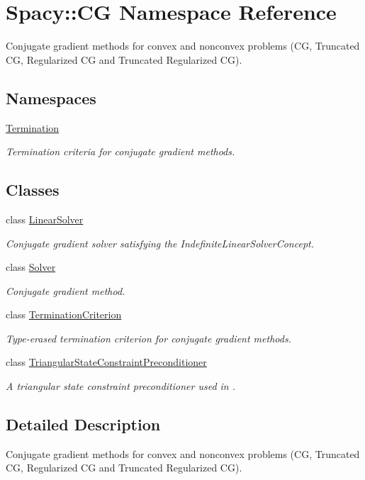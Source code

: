 \hypertarget{namespaceSpacy_1_1CG}{}\section{Spacy\+:\+:CG Namespace Reference}
\label{namespaceSpacy_1_1CG}


Conjugate gradient methods for convex and nonconvex problems (CG, Truncated CG, Regularized CG and Truncated Regularized CG).  


\subsection*{Namespaces}
\begin{DoxyCompactItemize}
\item 
 \hyperlink{namespaceSpacy_1_1CG_1_1Termination}{Termination}
\begin{DoxyCompactList}\small\item\em Termination criteria for conjugate gradient methods. \end{DoxyCompactList}\end{DoxyCompactItemize}
\subsection*{Classes}
\begin{DoxyCompactItemize}
\item 
class \hyperlink{classSpacy_1_1CG_1_1LinearSolver}{Linear\+Solver}
\begin{DoxyCompactList}\small\item\em Conjugate gradient solver satisfying the Indefinite\+Linear\+Solver\+Concept. \end{DoxyCompactList}\item 
class \hyperlink{classSpacy_1_1CG_1_1Solver}{Solver}
\begin{DoxyCompactList}\small\item\em Conjugate gradient method. \end{DoxyCompactList}\item 
class \hyperlink{classSpacy_1_1CG_1_1TerminationCriterion}{Termination\+Criterion}
\begin{DoxyCompactList}\small\item\em Type-\/erased termination criterion for conjugate gradient methods. \end{DoxyCompactList}\item 
class \hyperlink{classSpacy_1_1CG_1_1TriangularStateConstraintPreconditioner}{Triangular\+State\+Constraint\+Preconditioner}
\begin{DoxyCompactList}\small\item\em A triangular state constraint preconditioner used in \cite{Lubkoll2015a}. \end{DoxyCompactList}\end{DoxyCompactItemize}


\subsection{Detailed Description}
Conjugate gradient methods for convex and nonconvex problems (CG, Truncated CG, Regularized CG and Truncated Regularized CG). 